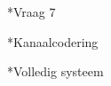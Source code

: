\documentclass[]{article}
\begin{document}
\begin{section}
\begin{subsection}
		\end{subsection}

      	\begin{subsection}*{Vraag 7}
   	\end{subsection}

\end{section}
\begin{section}*{Kanaalcodering}
\end{section}
\begin{section}*{Volledig systeem}
\end{section}
\end{document}
